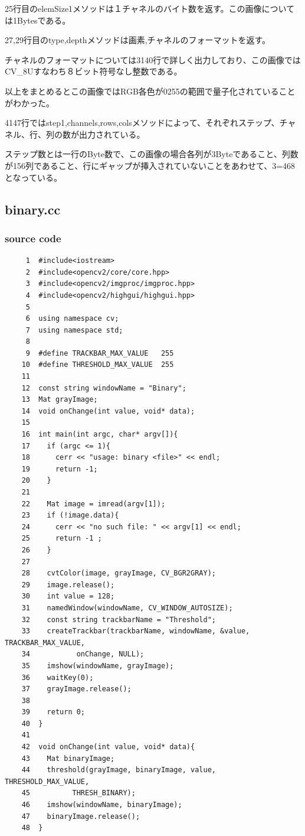 \documentclass{jsarticle}
\begin{document}
25行目のelemSize1メソッドは１チャネルのバイト数を返す。この画像については1Bytesである。  

27,29行目のtype,depthメソッドは画素,チャネルのフォーマットを返す。  

チャネルのフォーマットについては31\-40行で詳しく出力しており、この画像ではCV\_8Uすなわち８ビット符号なし整数である。  

以上をまとめるとこの画像ではRGB各色が0\-255の範囲で量子化されていることがわかった。  

41\-47行ではstep1,channels,rows,colsメソッドによって、それぞれステップ、チャネル、行、列の数が出力されている。

ステップ数とは一行のByte数で、この画像の場合各列が3Byteであること、列数が156列であること、行にギャップが挿入されていないことをあわせて、3=468となっている。

\subsection{binary.cc}

\subsubsection{source code}
\begin{verbatim}
     1	#include<iostream>
     2	#include<opencv2/core/core.hpp>
     3	#include<opencv2/imgproc/imgproc.hpp>
     4	#include<opencv2/highgui/highgui.hpp>
     5	
     6	using namespace cv;
     7	using namespace std;
     8	
     9	#define TRACKBAR_MAX_VALUE   255
    10	#define THRESHOLD_MAX_VALUE  255
    11	
    12	const string windowName = "Binary";
    13	Mat grayImage; 
    14	void onChange(int value, void* data);
    15	
    16	int main(int argc, char* argv[]){
    17	  if (argc <= 1){
    18	    cerr << "usage: binary <file>" << endl;
    19	    return -1;
    20	  }
    21	
    22	  Mat image = imread(argv[1]);
    23	  if (!image.data){
    24	    cerr << "no such file: " << argv[1] << endl;
    25	    return -1 ;
    26	  }
    27	
    28	  cvtColor(image, grayImage, CV_BGR2GRAY);
    29	  image.release();
    30	  int value = 128;
    31	  namedWindow(windowName, CV_WINDOW_AUTOSIZE);
    32	  const string trackbarName = "Threshold";
    33	  createTrackbar(trackbarName, windowName, &value, TRACKBAR_MAX_VALUE,
    34			 onChange, NULL);
    35	  imshow(windowName, grayImage);
    36	  waitKey(0);
    37	  grayImage.release();
    38	
    39	  return 0;
    40	}
    41	
    42	void onChange(int value, void* data){
    43	  Mat binaryImage;
    44	  threshold(grayImage, binaryImage, value, THRESHOLD_MAX_VALUE,
    45		    THRESH_BINARY);
    46	  imshow(windowName, binaryImage);
    47	  binaryImage.release();
    48	}
\end{verbatim}
\end{document}
